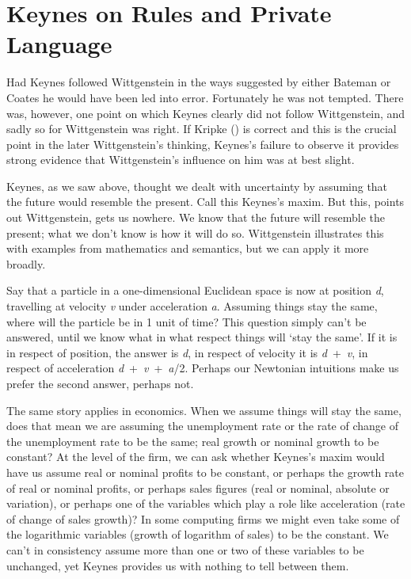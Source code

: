 \documentclass[
  11pt,
  letterpaper,
  DIV=11,
  numbers=noendperiod,
  twoside]{scrartcl}
\begin{document}
\section{Keynes on Rules and Private
Language}\label{keynes-on-rules-and-private-language}

Had Keynes followed Wittgenstein in the ways suggested by either Bateman
or Coates he would have been led into error. Fortunately he was not
tempted. There was, however, one point on which Keynes clearly did not
follow Wittgenstein, and sadly so for Wittgenstein was right. If Kripke
() is correct and this is the crucial
point in the later Wittgenstein's thinking, Keynes's failure to observe
it provides strong evidence that Wittgenstein's influence on him was at
best slight.

Keynes, as we saw above, thought we dealt with uncertainty by assuming
that the future would resemble the present. Call this Keynes's maxim.
But this, points out Wittgenstein, gets us nowhere. We know that the
future will resemble the present; what we don't know is how it will do
so. Wittgenstein illustrates this with examples from mathematics and
semantics, but we can apply it more broadly.

Say that a particle in a one-dimensional Euclidean space is now at
position \emph{d}, travelling at velocity \emph{v} under acceleration
\emph{a}. Assuming things stay the same, where will the particle be in 1
unit of time? This question simply can't be answered, until we know what
in what respect things will `stay the same'. If it is in respect of
position, the answer is \emph{d}, in respect of velocity it is
\emph{d}~+~\emph{v}, in respect of acceleration
\emph{d}~+~\emph{v}~+~\emph{a}/2. Perhaps our Newtonian intuitions make
us prefer the second answer, perhaps not.

The same story applies in economics. When we assume things will stay the
same, does that mean we are assuming the unemployment rate or the rate
of change of the unemployment rate to be the same; real growth or
nominal growth to be constant? At the level of the firm, we can ask
whether Keynes's maxim would have us assume real or nominal profits to
be constant, or perhaps the growth rate of real or nominal profits, or
perhaps sales figures (real or nominal, absolute or variation), or
perhaps one of the variables which play a role like acceleration (rate
of change of sales growth)? In some computing firms we might even take
some of the logarithmic variables (growth of logarithm of sales) to be
the constant. We can't in consistency assume more than one or two of
these variables to be unchanged, yet Keynes provides us with nothing to
tell between them.
\end{document}
